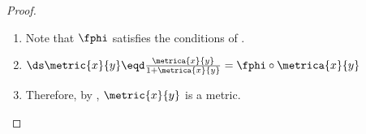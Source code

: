 \begin{proof}
\begin{enumerate}
  \item Note that $\fphi$ satisfies the conditions of .
  \item $\ds\metric{x}{y}\eqd \frac{\metrica{x}{y}}{1+\metrica{x}{y}}=\fphi\circ\metrica{x}{y}$
  \item Therefore, by , $\metric{x}{y}$ is a metric.
\end{enumerate}

\end{proof}

